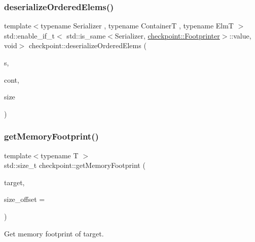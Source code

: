 \mbox{\label{namespacecheckpoint_a9976fffc8f39073e5b40ec61d93a5482}} 
\subsubsection{\texorpdfstring{deserialize\+Ordered\+Elems()}{deserializeOrderedElems()}\hspace{0.1cm}{\footnotesize\ttfamily [3/3]}}
{\footnotesize\ttfamily template$<$typename Serializer , typename ContainerT , typename ElmT $>$ \\
std\+::enable\+\_\+if\+\_\+t$<$ std\+::is\+\_\+same$<$Serializer, \hyperlink{structcheckpoint_1_1_footprinter}{checkpoint\+::\+Footprinter}$>$\+::value, void$>$ checkpoint\+::deserialize\+Ordered\+Elems (\begin{DoxyParamCaption}\item[{Serializer \&}]{s,  }\item[{ContainerT \&}]{cont,  }\item[{typename Container\+T\+::size\+\_\+type}]{size }\end{DoxyParamCaption})\hspace{0.3cm}{\ttfamily [inline]}}

\mbox{\label{namespacecheckpoint_a3c06c0dd0b9bccfd2aa6b79570b9cda1}} 
\subsubsection{\texorpdfstring{get\+Memory\+Footprint()}{getMemoryFootprint()}}
{\footnotesize\ttfamily template$<$typename T $>$ \\
std\+::size\+\_\+t checkpoint\+::get\+Memory\+Footprint (\begin{DoxyParamCaption}\item[{T \&}]{target,  }\item[{std\+::size\+\_\+t}]{size\+\_\+offset = {} }\end{DoxyParamCaption})}



Get memory footprint of {\ttfamily target}. 


